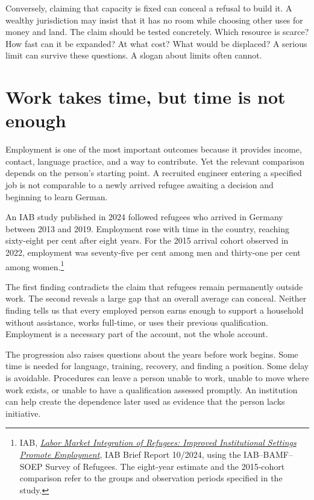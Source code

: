 \documentclass[12pt,a4paper]{book}
\begin{document}
Conversely, claiming that capacity is fixed can conceal a refusal to build it. A wealthy jurisdiction may insist that it has no room while choosing other uses for money and land. The claim should be tested concretely. Which resource is scarce? How fast can it be expanded? At what cost? What would be displaced? A serious limit can survive these questions. A slogan about limits often cannot.

\section*{Work takes time, but time is not enough}

Employment is one of the most important outcomes because it provides income, contact, language practice, and a way to contribute. Yet the relevant comparison depends on the person's starting point. A recruited engineer entering a specified job is not comparable to a newly arrived refugee awaiting a decision and beginning to learn German.

An IAB study published in 2024 followed refugees who arrived in Germany between 2013 and 2019. Employment rose with time in the country, reaching sixty-eight per cent after eight years. For the 2015 arrival cohort observed in 2022, employment was seventy-five per cent among men and thirty-one per cent among women.\footnote{IAB, \href{https://doku.iab.de/kurzber/2024/kb2024-10_en.pdf}{\emph{Labor Market Integration of Refugees: Improved Institutional Settings Promote Employment}}, IAB Brief Report 10/2024, using the IAB--BAMF--SOEP Survey of Refugees. The eight-year estimate and the 2015-cohort comparison refer to the groups and observation periods specified in the study.}

The first finding contradicts the claim that refugees remain permanently outside work. The second reveals a large gap that an overall average can conceal. Neither finding tells us that every employed person earns enough to support a household without assistance, works full-time, or uses their previous qualification. Employment is a necessary part of the account, not the whole account.

The progression also raises questions about the years before work begins. Some time is needed for language, training, recovery, and finding a position. Some delay is avoidable. Procedures can leave a person unable to work, unable to move where work exists, or unable to have a qualification assessed promptly. An institution can help create the dependence later used as evidence that the person lacks initiative.
\end{document}
